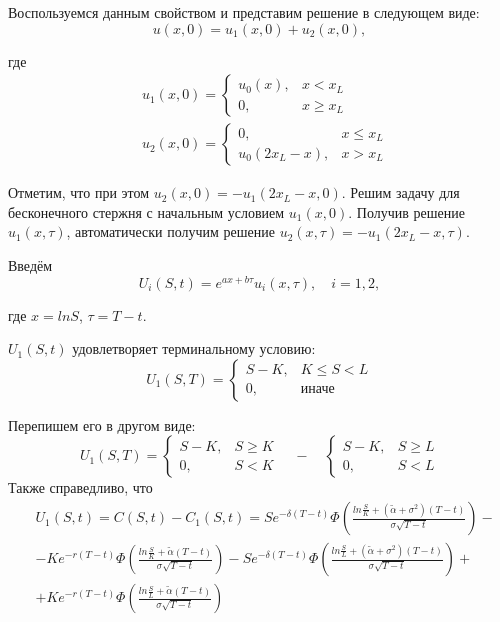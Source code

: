 \documentclass[oneside,final,12pt]{article}
\begin{document}
\newpage
Воспользуемся данным свойством и представим решение в следующем виде:
$$u(x,0)=u_1(x,0)+u_2(x,0),$$

\noindent
где
\begin{align*}
    & u_1(x,0)=
    \begin{cases}
    u_0(x), & x<x_L \\
    0, & x\geq x_L
    \end{cases} \\
    & u_2(x,0)=
    \begin{cases}
    0, & x\leq x_L \\
    u_0(2x_L-x), & x> x_L
    \end{cases}
\end{align*}

Отметим, что при этом $u_2(x,0)=-u_1(2x_L-x,0)$. Решим задачу для бесконечного стержня с начальным условием $u_1(x,0)$. Получив решение $u_1(x,\tau)$, автоматически получим решение $u_2(x,\tau)=-u_1(2x_L-x,\tau)$.

Введём 
$$
U_i(S,t) = e^{ax+b\tau} u_i(x,\tau), \quad i=1,2,
$$

\noindent
где $x=ln S$, \quad $\tau=T-t$.

$U_1(S,t)$ удовлетворяет терминальному условию:
$$
U_1(S,T)=
\begin{cases}
S-K, & K\leq S < L \\
0, & \text{иначе}
\end{cases}
$$

Перепишем его в другом виде:
$$
U_1(S,T)=
\begin{cases}
S-K, & S \geq K \\
0, & S<K
\end{cases}
\quad - \quad
\begin{cases}
S-K, & S \geq L \\
0, & S<L
\end{cases}
$$
Также справедливо, что
\begin{align*}
    & U_1(S,t)=C(S,t)-C_1(S,t) = Se^{-\delta(T-t)} 
    \Phi \left( \frac{ln\frac{S}{K} + (\widetilde{\alpha}+\sigma^2)(T-t)}{\sigma \sqrt{T-t}}\right) - \\
    & - Ke^{-r(T-t)} \Phi \left( \frac{ln\frac{S}{K} + \widetilde{\alpha}(T-t)}{\sigma \sqrt{T-t}}\right) -
    Se^{-\delta(T-t)} 
    \Phi \left( \frac{ln\frac{S}{L} + (\widetilde{\alpha}+\sigma^2)(T-t)}{\sigma \sqrt{T-t}}\right) + \\
    & + Ke^{-r(T-t)} \Phi \left( \frac{ln\frac{S}{L} + \widetilde{\alpha}(T-t)}{\sigma \sqrt{T-t}}\right)
\end{align*}
\end{document}
